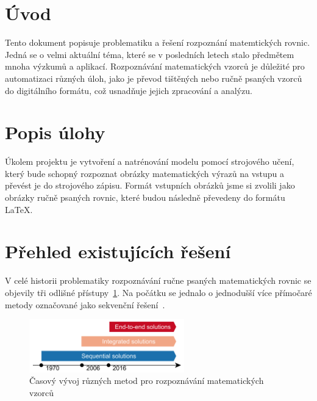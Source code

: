 \section{Úvod}
Tento dokument popisuje problematiku a řešení rozpoznání matemtických rovnic. Jedná se o velmi aktuální téma, které se v posledních letech stalo předmětem mnoha výzkumů a aplikací. Rozpoznávání matematických vzorců je důležité pro automatizaci různých úloh, jako je převod tištěných nebo ručně psaných vzorců do digitálního formátu, což usnadňuje jejich zpracování a analýzu.


\section{Popis úlohy}
Úkolem projektu je vytvoření a natrénování modelu pomocí strojového učení, který bude schopný rozpoznat obrázky matematických výrazů na vstupu a převést je do strojového zápisu. Formát vstupních obrázků jsme si zvolili jako obrázky ručně psaných rovnic, které budou následně převedeny do formátu LaTeX.  


\section{Přehled existujících řešení}
V celé historii problematiky rozpoznávání ručne psaných matematických rovnic se objevily tři odlišné přístupy~\ref{img:method_history}. Na počátku se jednalo o jednodušší více přímočaré metody označované jako sekvenční řešení~\cite{ukr_survey}.

\begin{figure}[H]
    \centering
    \includegraphics[width=0.6\textwidth]{img/method_history.png}
    \caption{Časový vývoj různých metod pro rozpoznávání matematických vzorců}
    \label{img:method_history}
\end{figure}


